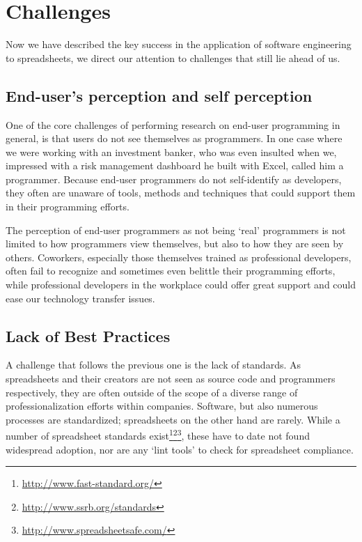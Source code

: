 \documentclass[conference]{IEEEtran}
\begin{document}

\section{Challenges} 
Now we have described the key success in the application of software engineering to spreadsheets, we direct our attention to challenges that still lie ahead of us. 

\subsection{End-user's perception and self perception}
One of the core challenges of performing research on end-user programming in general, is that users do not see themselves as programmers. In one case where we were working with an investment banker, who was even insulted when we, impressed with a risk management dashboard he built with Excel, called him a programmer. Because end-user programmers do not self-identify as developers, they often are unaware of tools, methods and techniques that could support them in their programming efforts.

The perception of end-user programmers as not being `real' programmers is not limited to how programmers view themselves, but also to how they are seen by others. Coworkers, especially those themselves trained as professional developers, often fail to recognize and sometimes even belittle their programming efforts, while professional developers in the workplace could offer great support and could ease our technology transfer issues. 

\subsection{Lack of Best Practices}
A challenge that follows the previous one is the lack of standards. As spreadsheets and their creators are not seen as source code and programmers respectively, they are often outside of the scope of a diverse range of professionalization efforts within companies. Software, but also numerous processes are standardized; spreadsheets on the other hand are rarely. While a number of spreadsheet standards exist\footnote{\url{http://www.fast-standard.org/}}\footnote{\url{http://www.ssrb.org/standards}}\footnote{\url{http://www.spreadsheetsafe.com/}}, these have to date not found widespread adoption, nor are any `lint tools' to check for spreadsheet compliance. 
\end{document}
